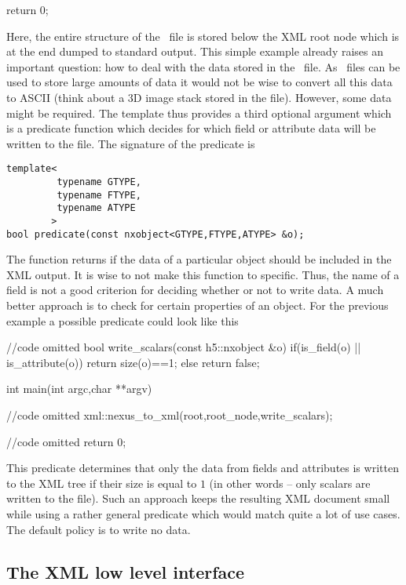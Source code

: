 {\begin{cppcode}
{    return 0;
}
\end{cppcode}
Here, the entire structure of the \nexus\ file is stored below the XML root node 
which is at the end dumped to standard output.
This simple example already raises an important question: how to deal with the
data stored in the \nexus\ file. As \nexus\ files can be used to store large amounts
of data it would not be wise to convert all this data to ASCII (think about a 3D
image stack stored in the file). However, some data might be required. 
The  template thus provides a third optional argument which 
is a predicate function which decides for which field or attribute data will be
written to the file. 
The signature of the predicate is 
\begin{verbatim}
template<
         typename GTYPE,
         typename FTYPE,
         typename ATYPE
        >
bool predicate(const nxobject<GTYPE,FTYPE,ATYPE> &o);
\end{verbatim}
The function returns  if the data of a particular object should be 
included in the XML output. 
It is wise to not make this function to specific. Thus, the name of a field 
is not a good criterion for deciding whether or not to write data. 
A much better approach is to check for certain properties of an object. 
For the previous example a possible predicate could look like this
\begin{cppcode}
//code omitted 
bool write_scalars(const h5::nxobject &o)
{
    if(is_field(o) || is_attribute(o))
    {
       return size(o)==1;
    }
    else 
        return false;
}

int main(int argc,char **argv)
{
    //code omitted 
    xml::nexus_to_xml(root,root_node,write_scalars);

    //code omitted
    return 0;
}
\end{cppcode}
This predicate determines that only the data from fields and attributes 
is written to the XML tree if their size is equal to $1$ (in other words -- only
scalars are written to the file). 
Such an approach keeps the resulting XML document small while using a rather 
general predicate which would match quite a lot of use cases. The default 
policy is to write no data.


\subsection{The XML low level interface}\label{sec:xml:lowlevel}

}
